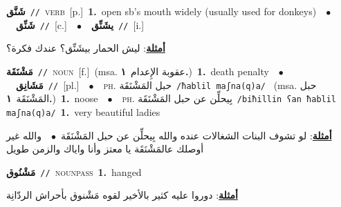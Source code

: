 \documentclass[10pt,a4paper,twoside]{article} %
\begin{document}
\begin{multicols}{2}
{\setlength\topsep{0pt}\textbf{\foreignlanguage{arabic}{شَنَّق}}\ {\color{gray}\texttt{//}\color{black}}\ \textsc{verb}\ [p.]\ \textbf{1.}~open sb's mouth widely (usually used for donkeys)\ \ $\bullet$\ \ \setlength\topsep{0pt}\textbf{\foreignlanguage{arabic}{شَنِّق}}\ {\color{gray}\texttt{//}\color{black}}\ [c.]\ \ $\bullet$\ \ \setlength\topsep{0pt}\textbf{\foreignlanguage{arabic}{يشَنِّق}}\ {\color{gray}\texttt{//}\color{black}}\ [i.]\  \begin{flushright}\color{gray}\foreignlanguage{arabic}{\textbf{\underline{\foreignlanguage{arabic}{أمثلة}}}: ليش الحمار بيشَنِّق؟ عندك فكرة؟}\end{flushright}\color{black}} \vspace{2mm}

{\setlength\topsep{0pt}\textbf{\foreignlanguage{arabic}{مَشْنَقَة}}\ {\color{gray}\texttt{//}\color{black}}\ \textsc{noun}\ [f.]\ \color{gray}(msa. \foreignlanguage{arabic}{عقوبة الإِعدام}~\foreignlanguage{arabic}{\textbf{١.}})\color{black}\ \textbf{1.}~death penalty\ \ $\bullet$\ \ \setlength\topsep{0pt}\textbf{\foreignlanguage{arabic}{مَشَانِق}}\ {\color{gray}\texttt{//}\color{black}}\ [pl.]\ \ $\bullet$\ \ \textsc{ph.} \color{gray} \foreignlanguage{arabic}{حبل المَشْنَقَة}\color{black}\ {\color{gray}\texttt{/{\sffamily ħablil maʃna(q)a}/}\color{black}}\ \color{gray} (msa. \foreignlanguage{arabic}{حبل المَشْنَقَة}~\foreignlanguage{arabic}{\textbf{١.}})\color{black}\ \textbf{1.}~noose\ \ $\bullet$\ \ \textsc{ph.} \color{gray} \foreignlanguage{arabic}{بِيحلِّن عن حبل المَشْنَقَة}\color{black}\ {\color{gray}\texttt{/{\sffamily biħillin ʕan ħablil maʃna(q)a}/}\color{black}}\ \textbf{1.}~very beautiful ladies\  \begin{flushright}\color{gray}\foreignlanguage{arabic}{\textbf{\underline{\foreignlanguage{arabic}{أمثلة}}}: لو تشوف البنات الشغالات عنده والله بِيحلِّن عن حبل المَشْنَقَة\ $\bullet$\ \  والله غير أوصلك عالمَشْنَقَة يا معتز وأنا واياك والزمن طويل}\end{flushright}\color{black}} \vspace{2mm}

{\setlength\topsep{0pt}\textbf{\foreignlanguage{arabic}{مَشْنُوق}}\ {\color{gray}\texttt{//}\color{black}}\ \textsc{noun\textunderscore pass}\ \textbf{1.}~hanged\  \begin{flushright}\color{gray}\foreignlanguage{arabic}{\textbf{\underline{\foreignlanguage{arabic}{أمثلة}}}: دوروا عليه كثير بالأخير لقوه مَشْنوق بأحراش الردّانِة}\end{flushright}\color{black}} \vspace{2mm}


\end{multicols}
\end{document}
